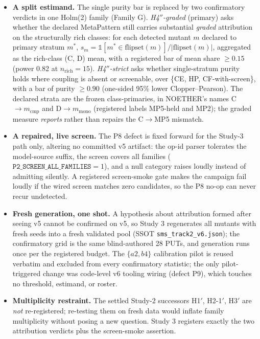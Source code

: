 \documentclass[manuscript,screen,review]{acmart}
\begin{document}
\begin{itemize}
\item
  \textbf{A split estimand.} The single purity bar is replaced by two
  confirmatory verdicts in one Holm(2) family (Family G). \emph{H4\('' \)-graded}
  (primary) asks whether the declared MetaPattern still carries substantial
  \emph{graded} attribution on the structurally rich classes: for each detected
  mutant \(m\) declared to primary stratum \(m^{*}\),
  \(s_m = \mathbb{1}[m^{*}\in\mathrm{flipset}(m)]/|\mathrm{flipset}(m)|\),
  aggregated as the rich-class (C, D) mean, with a registered bar of mean share
  \(\geq 0.15\) (power 0.82 at \(n_{\mathrm{rich}}=15\)). \emph{H4\('' \)-strict}
  asks whether single-stratum purity holds where coupling is absent or
  screenable, over \{CE, HP, CF-with-screen\}, with a bar of purity \(\geq 0.90\)
  (one-sided 95\% lower Clopper--Pearson). The declared strata are the frozen
  class-primaries, in NOETHER's names C\(\to m_{\mathrm{cmp}}\) and
  D\(\to m_{\mathrm{mono}}\) (registered labels MP5-held and MP2); the graded
  measure \emph{reports} rather than repairs the C\(\to\)MP5 mismatch.
\item
  \textbf{A repaired, live screen.} The P8 defect is fixed forward for the
  Study-3 path only, altering no committed v5 artifact: the op-id parser
  tolerates the model-source suffix, the screen covers all families
  (\(\texttt{P2\_SCREEN\_ALL\_FAMILIES}=1\)), and a null category raises loudly
  instead of admitting silently. A registered screen-smoke gate makes the
  campaign fail loudly if the wired screen matches zero candidates, so the P8
  no-op can never recur undetected.
\item
  \textbf{Fresh generation, one shot.} A hypothesis about attribution formed
  after seeing v5 cannot be confirmed on v5, so Study 3 regenerates all mutants
  with fresh seeds into a fresh validated pool (SSOT
  \texttt{sms\_track2\_v6.json}); the confirmatory grid is the same
  blind-authored 28 PUTs, and generation runs once per the registered budget.
  The \(\{a2, b4\}\) calibration pilot is reused verbatim and excluded from
  every confirmatory statistic; the only pilot-triggered change was code-level
  v6 tooling wiring (defect P9), which touches no threshold, estimand, or
  roster.
\item
  \textbf{Multiplicity restraint.} The settled Study-2 successors H1\('\),
  H2-1\('\), H3\('\) are \emph{not} re-registered; re-testing them on fresh data
  would inflate family multiplicity without posing a new question. Study 3
  registers exactly the two attribution verdicts plus the screen-smoke
  assertion.
\end{itemize}
\end{document}
